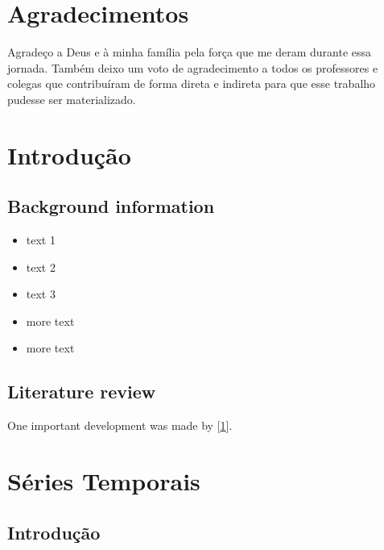 \documentclass[
  openany]{book}
\providecommand{\tightlist}{%
  \setlength{\itemsep}{0pt}\setlength{\parskip}{0pt}}
\begin{document}
{
\hypersetup{linkcolor=}
\setcounter{tocdepth}{1}
\tableofcontents
}
\listoftables
\listoffigures
\hypertarget{agradecimentos}{%
\chapter*{Agradecimentos}\label{agradecimentos}}

Agradeço a Deus e à minha família pela força que me deram durante essa jornada.
Também deixo um voto de agradecimento a todos os professores e colegas que contribuíram de forma direta e indireta para que esse trabalho pudesse ser materializado.

\mainmatter

\hypertarget{introduuxe7uxe3o}{%
\chapter{Introdução}\label{introduuxe7uxe3o}}

\hypertarget{background-information}{%
\section{Background information}\label{background-information}}

\begin{itemize}
\tightlist
\item
  text 1
\item
  text 2
\item
  text 3
\item
  more text
\item
  more text
\end{itemize}

\hypertarget{literature-review}{%
\section{Literature review}\label{literature-review}}

One important development was made by {[}\protect\hyperlink{ref-Abrams2005}{1}{]}.

\hypertarget{suxe9ries-temporais}{%
\chapter{Séries Temporais}\label{suxe9ries-temporais}}

\hypertarget{introduuxe7uxe3o-1}{%
\section{Introdução}\label{introduuxe7uxe3o-1}}
\end{document}
